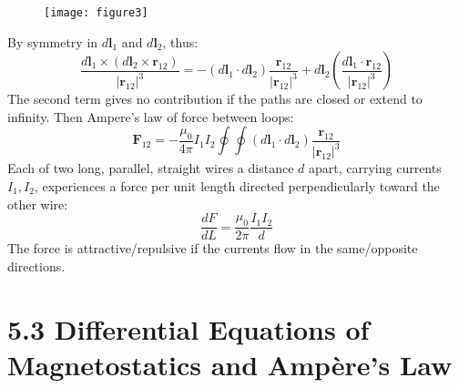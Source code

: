 \documentclass{article}
\begin{document}
	\begin{figure}[h]
		\centering
		\texttt{[image: figure3]}
		\caption{}
		\label{fig:figure3}
	\end{figure}
	
	By symmetry in $d\mathbf{l}_1$ and $d\mathbf{l}_2$, thus:
	\begin{equation*}
		\frac{d\mathbf{l}_1 \times (d\mathbf{l}_2 \times \mathbf{r}_{12})}{|\mathbf{r}_{12}|^3} = -(d\mathbf{l}_1 \cdot d\mathbf{l}_2) \frac{\mathbf{r}_{12}}{|\mathbf{r}_{12}|^3} + d\mathbf{l}_2 \left( \frac{d\mathbf{l}_1 \cdot \mathbf{r}_{12}}{|\mathbf{r}_{12}|^3} \right)
	\end{equation*}
	The second term gives no contribution if the paths are closed or extend to infinity. Then Ampere's law of force between loops:
	\begin{equation*}
		\mathbf{F}_{12} = -\frac{\mu_0}{4\pi} I_1 I_2 \oint \oint (d\mathbf{l}_1 \cdot d\mathbf{l}_2) \frac{\mathbf{r}_{12}}{|\mathbf{r}_{12}|^3}
	\end{equation*}
	Each of two long, parallel, straight wires a distance $d$ apart, carrying currents $I_1, I_2$, experiences a force per unit length directed perpendicularly toward the other wire:
	\begin{equation*}
		\frac{dF}{dL} = \frac{\mu_0}{2\pi} \frac{I_1 I_2}{d}
	\end{equation*}
	The force is attractive/repulsive if the currents flow in the same/opposite directions.
	\section*{5.3 Differential Equations of Magnetostatics and Ampère's Law}
	
\end{document}
